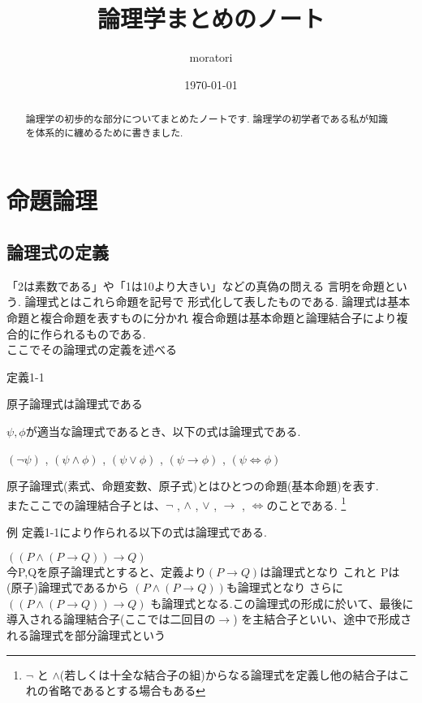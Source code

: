 \documentclass[10pt]{jarticle}
\begin{document}
	
	
	\title{論理学まとめのノート}
	\author{moratori}
	\date{\today}
	\maketitle


	
	\begin{abstract}
		論理学の初歩的な部分についてまとめたノートです. 
		論理学の初学者である私が知識を体系的に纏めるために書きました.
	\end{abstract}





	\section{命題論理}
	
	
	
	\subsection{論理式の定義}
	「2は素数である」や「1は10より大きい」などの真偽の問える
	言明を命題という. 論理式とはこれら命題を記号で
	形式化して表したものである. 論理式は基本命題と複合命題を表すものに分かれ
	複合命題は基本命題と論理結合子により複合的に作られるものである. \\
	ここでその論理式の定義を述べる
	\begin{itembox}[l]{定義1-1}

		原子論理式は論理式である 

		\(\psi , \phi \)が適当な論理式であるとき、以下の式は論理式である. 

		\((\lnot \psi) \) , \((\psi \land \phi)\) , \((\psi \lor \phi)\) , \((\psi \to \phi)\) , \((\psi \Leftrightarrow \phi)\)
	\end{itembox}
	原子論理式(素式、命題変数、原子式)とはひとつの命題(基本命題)を表す. \\
	またここでの論理結合子とは、\(\lnot\) , \(\land\) , \(\lor\) , \(\to\) , \(\Leftrightarrow\)のことである.
	\footnote{\(\lnot\) と \(\land\)(若しくは十全な結合子の組)からなる論理式を定義し他の結合子はこれの省略であるとする場合もある }
	\begin{itembox}[l]{例}
		定義1-1により作られる以下の式は論理式である. 

		\(((P \land (P \to Q)) \to Q) \) \\
		今P,Qを原子論理式とすると、定義より\((P \to Q)\)は論理式となり 
		これと Pは(原子)論理式であるから \((P \land (P \to Q))\)も論理式となり 
		さらに \(((P \land (P \to Q)) \to Q)\) も論理式となる.この論理式の形成に於いて、最後に導入される論理結合子(ここでは二回目の\(\to\))
		を主結合子といい、途中で形成される論理式を部分論理式という
	\end{itembox}
\end{document}
